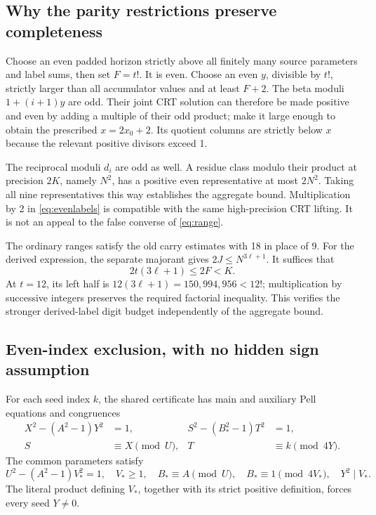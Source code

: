 \documentclass[11pt,letterpaper]{article}
\theoremstyle{remark}\newtheorem{remark}[theorem]{Remark}
\begin{document}
\subsection{Why the parity restrictions preserve completeness}

Choose an even padded horizon strictly above all finitely many source
parameters and label sums, then set \(F=t!\). It is even. Choose an
even \(y\), divisible by \(t!\), strictly larger than all accumulator
values and at least \(F+2\). The beta moduli \(1+(i+1)y\) are odd.
Their joint CRT solution can therefore be made positive and even by
adding a multiple of their odd product; make it large enough to obtain
the prescribed \(x=2x_0+2\). Its quotient columns are strictly below
\(x\) because the relevant positive divisors exceed 1.

The reciprocal moduli \(d_i\) are odd as well. A residue class modulo
their product at precision \(2K\), namely \(N^2\), has a positive
even representative at most \(2N^2\). Taking all nine representatives
this way establishes the aggregate bound. Multiplication by 2 in
\eqref{eq:evenlabels} is compatible with the same high-precision CRT
lifting. It is not an appeal to the false converse of
\eqref{eq:range}.

The ordinary ranges satisfy the old carry estimates with 18 in place
of 9. For the derived expression, the separate majorant gives
\(2J\le N^{3\ell+1}\). It suffices that
\[
 2t(3\ell+1)\le2F<K.
\]
At \(t=12\), its left half is
\(12(3\ell+1)=150,994,956<12!\); multiplication by successive
integers preserves the required factorial inequality. This verifies the
stronger derived-label digit budget independently of the aggregate bound.

\subsection{Even-index exclusion, with no hidden sign assumption}

For each seed index \(k\), the shared certificate has main and auxiliary
Pell equations and congruences
\begin{align*}
 X^2-(A^2-1)Y^2&=1,&S^2-(B_*^2-1)T^2&=1,\\
 S&\equiv X\pmod U,&T&\equiv k\pmod{4Y}.
\end{align*}
The common parameters satisfy
\[
 U^2-(A^2-1)V_*^2=1,\quad V_*\ge1,\quad
 B_*\equiv A\pmod U,\quad B_*\equiv1\pmod{4V_*},\quad
 Y^2\mid V_*.
\]
The literal product defining \(V_*\), together with its strict
positive definition, forces every seed \(Y\ne0\).
\end{document}
